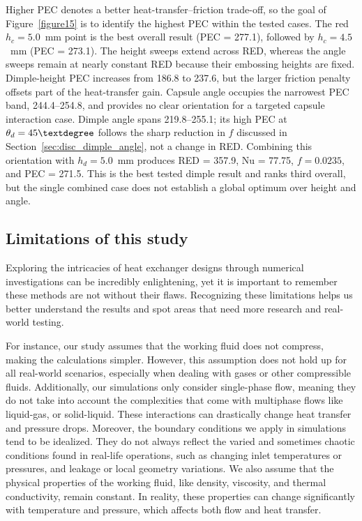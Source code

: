 \documentclass[energies,article,submit,moreauthors,noheaderline]{Definitions/mdpi}
\newcommand{\degree}{\texorpdfstring{\ensuremath{^\circ}}{\textdegree}}
\def\ensuremath#1{}%
\def\degree{\textdegree}%
\def\,{ }%
\begin{document}
Higher PEC denotes a better heat-transfer--friction trade-off, so the goal of Figure~\ref{figure15} is to identify the highest PEC within the tested cases. The red $h_c=5.0$~mm point is the best overall result (PEC\,=\,277.1), followed by $h_c=4.5$~mm (PEC\,=\,273.1). The height sweeps extend across RED, whereas the angle sweeps remain at nearly constant RED because their embossing heights are fixed. Dimple-height PEC increases from 186.8 to 237.6, but the larger friction penalty offsets part of the heat-transfer gain. Capsule angle occupies the narrowest PEC band, 244.4--254.8, and provides no clear orientation for a targeted capsule interaction case. Dimple angle spans 219.8--255.1; its high PEC at $\theta_d=45\degree$ follows the sharp reduction in $f$ discussed in Section~\ref{sec:disc_dimple_angle}, not a change in RED. Combining this orientation with $h_d=5.0$~mm produces RED\,=\,357.9, Nu\,=\,77.75, $f=0.0235$, and PEC\,=\,271.5. This is the best tested dimple result and ranks third overall, but the single combined case does not establish a global optimum over height and angle.

\subsection{Limitations of this study}
\label{sec:limitations}

Exploring the intricacies of heat exchanger designs through numerical investigations can be incredibly enlightening, yet it is important to remember these methods are not without their flaws. Recognizing these limitations helps us better understand the results and spot areas that need more research and real-world testing.

For instance, our study assumes that the working fluid does not compress, making the calculations simpler. However, this assumption does not hold up for all real-world scenarios, especially when dealing with gases or other compressible fluids. Additionally, our simulations only consider single-phase flow, meaning they do not take into account the complexities that come with multiphase flows like liquid-gas, or solid-liquid. These interactions can drastically change heat transfer and pressure drops. Moreover, the boundary conditions we apply in simulations tend to be idealized. They do not always reflect the varied and sometimes chaotic conditions found in real-life operations, such as changing inlet temperatures or pressures, and leakage or local geometry variations. We also assume that the physical properties of the working fluid, like density, viscosity, and thermal conductivity, remain constant. In reality, these properties can change significantly with temperature and pressure, which affects both flow and heat transfer.
\end{document}
